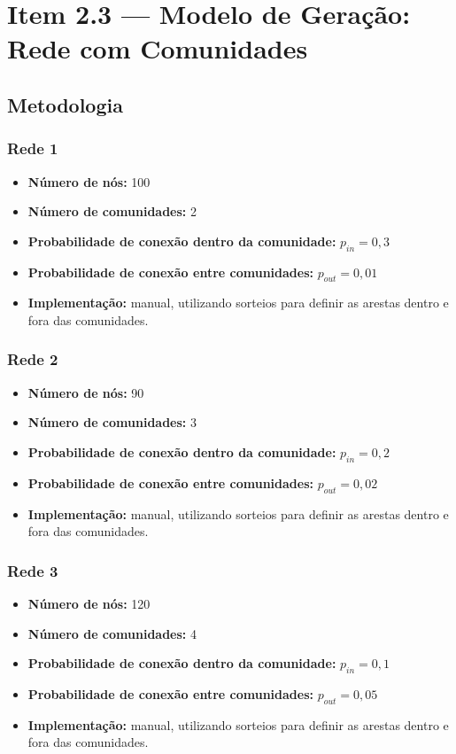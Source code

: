 \documentclass[a4paper]{article}
\begin{document}
\newpage

\section*{Item 2.3 — Modelo de Geração: Rede com Comunidades}

\subsection*{Metodologia}

\subsubsection{Rede 1}
\begin{itemize}
    \item \textbf{Número de nós:} 100
    \item \textbf{Número de comunidades:} 2
    \item \textbf{Probabilidade de conexão dentro da comunidade:} \(p_{in} = 0{,}3\)
    \item \textbf{Probabilidade de conexão entre comunidades:} \(p_{out} = 0{,}01\)
    \item \textbf{Implementação:} manual, utilizando sorteios para definir as arestas dentro e fora das comunidades.
\end{itemize}

\subsubsection{Rede 2}
\begin{itemize}
    \item \textbf{Número de nós:} 90
    \item \textbf{Número de comunidades:} 3
    \item \textbf{Probabilidade de conexão dentro da comunidade:} \(p_{in} = 0{,}2\)
    \item \textbf{Probabilidade de conexão entre comunidades:} \(p_{out} = 0{,}02\)
    \item \textbf{Implementação:} manual, utilizando sorteios para definir as arestas dentro e fora das comunidades.
\end{itemize}

\subsubsection{Rede 3}
\begin{itemize}
    \item \textbf{Número de nós:} 120
    \item \textbf{Número de comunidades:} 4
    \item \textbf{Probabilidade de conexão dentro da comunidade:} \(p_{in} = 0{,}1\)
    \item \textbf{Probabilidade de conexão entre comunidades:} \(p_{out} = 0{,}05\)
    \item \textbf{Implementação:} manual, utilizando sorteios para definir as arestas dentro e fora das comunidades.
\end{itemize}
\end{document}
